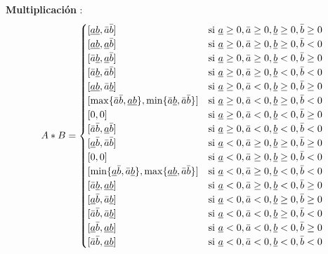 \documentclass{article}
\begin{document}
\begin{flushleft}
\textbf{Multiplicación }: \\

    \[
    A * B = 
    \begin{cases} 
    [\uline{ab}, \bar{a}\bar{b}] & \text{si } \uline{a} \geq 0, \bar{a} \geq 0, \uline{b} \geq 0, \bar{b} \geq 0 \\
    [\uline{ab}, \uline{a}\bar{b}] & \text{si } \uline{a} \geq 0, \bar{a} \geq 0, \uline{b} \geq 0, \bar{b} < 0 \\
    [\bar{a}\uline{b}, \uline{a}\bar{b}] & \text{si } \uline{a} \geq 0, \bar{a} \geq 0, \uline{b} < 0, \bar{b} \geq 0 \\
    [\bar{a}\uline{b}, \bar{a}\bar{b}] & \text{si } \uline{a} \geq 0, \bar{a} \geq 0, \uline{b} < 0, \bar{b} < 0 \\
    [\uline{ab}, \bar{a}\uline{b}] & \text{si } \uline{a} \geq 0, \bar{a} < 0, \uline{b} \geq 0, \bar{b} \geq 0 \\
    [\max\{\bar{a}\bar{b}, \uline{ab}\}, \min\{\bar{a}\uline{b}, \bar{a}\bar{b}\}] & \text{si } \uline{a} \geq 0, \bar{a} < 0, \uline{b} \geq 0, \bar{b} < 0 \\
    [0, 0] & \text{si } \uline{a} \geq 0, \bar{a} < 0, \uline{b} < 0, \bar{b} \geq 0 \\
    [\bar{a}\bar{b}, \uline{a}\bar{b}] & \text{si } \uline{a} \geq 0, \bar{a} < 0, \uline{b} < 0, \bar{b} < 0 \\
    [\uline{a}\bar{b}, \bar{a}\bar{b}] & \text{si } \uline{a} < 0, \bar{a} \geq 0, \uline{b} \geq 0, \bar{b} \geq 0 \\
    [0, 0] & \text{si } \uline{a} < 0, \bar{a} \geq 0, \uline{b} \geq 0, \bar{b} < 0 \\
    [\min\{\uline{a}\bar{b}, \bar{a}\uline{b}\}, \max\{\uline{ab}, \bar{a}\bar{b}\}] & \text{si } \uline{a} < 0, \bar{a} \geq 0, \uline{b} < 0, \bar{b} < 0 \\
    [\bar{a}\uline{b}, \uline{ab}] & \text{si } \uline{a} < 0, \bar{a} \geq 0, \uline{b} < 0, \bar{b} \geq 0 \\
    [\uline{a}\bar{b}, \bar{a}\uline{b}] & \text{si } \uline{a} < 0, \bar{a} < 0, \uline{b} \geq 0, \bar{b} \geq 0 \\
    [\bar{a}\bar{b}, \bar{a}\uline{b}] & \text{si } \uline{a} < 0, \bar{a} < 0, \uline{b} \geq 0, \bar{b} < 0 \\
    [\uline{a}\bar{b}, \uline{ab}] & \text{si } \uline{a} < 0, \bar{a} < 0, \uline{b} < 0, \bar{b} \geq 0 \\
    [\bar{a}\bar{b}, \uline{ab}] & \text{si } \uline{a} < 0, \bar{a} < 0, \uline{b} < 0, \bar{b} < 0 
    \end{cases}
    \]
\end{flushleft}
\end{document}
